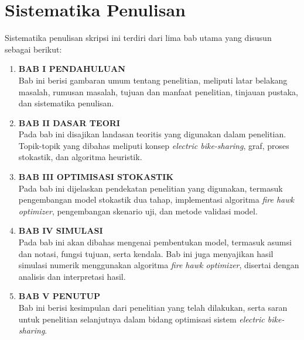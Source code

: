 \section{Sistematika Penulisan}
Sistematika penulisan skripsi ini terdiri dari lima bab utama yang disusun sebagai berikut:
\begin{enumerate}
    \item \textbf{BAB I PENDAHULUAN}\\
    Bab ini berisi gambaran umum tentang penelitian, meliputi latar belakang masalah, rumusan masalah, tujuan dan manfaat penelitian, tinjauan pustaka, dan sistematika penulisan.
    \item \textbf{BAB II DASAR TEORI}\\
    Pada bab ini disajikan landasan teoritis yang digunakan dalam penelitian. Topik-topik yang dibahas meliputi konsep \textit{\textit{electric bike-sharing}}, graf, proses stokastik, dan algoritma heuristik.
    \item \textbf{BAB III OPTIMISASI STOKASTIK}\\
    Pada bab ini dijelaskan pendekatan penelitian yang digunakan, termasuk pengembangan model stokastik dua tahap, implementasi algoritma \textit{fire hawk optimizer}, pengembangan skenario uji, dan metode validasi model.
    \item \textbf{BAB IV SIMULASI}\\
    Pada bab ini akan dibahas mengenai pembentukan model, termasuk asumsi dan notasi, fungsi tujuan, serta kendala. Bab ini juga menyajikan hasil simulasi numerik menggunakan algoritma\textit{ fire hawk optimizer}, disertai dengan analisis dan interpretasi hasil.
    \item \textbf{BAB V PENUTUP}\\
    Bab ini berisi kesimpulan dari penelitian yang telah dilakukan, serta saran untuk penelitian selanjutnya dalam bidang optimisasi sistem \textit{\textit{electric bike-sharing}}.
\end{enumerate}
